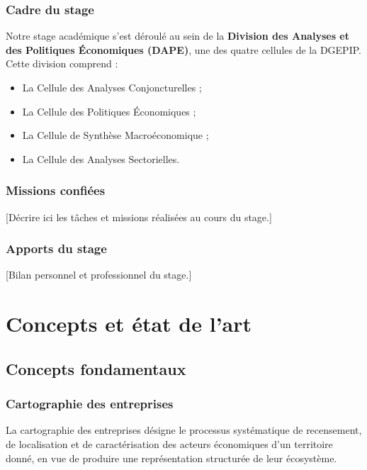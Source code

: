\documentclass[12pt, a4paper, oneside]{report}
\begin{document}
\subsection{Cadre du stage}

Notre stage académique s'est déroulé au sein de la \textbf{Division des Analyses et des Politiques Économiques (DAPE)}, une des quatre cellules de la DGEPIP. Cette division comprend :

\begin{itemize}
  \item La Cellule des Analyses Conjoncturelles ;
  \item La Cellule des Politiques Économiques ;
  \item La Cellule de Synthèse Macroéconomique ;
  \item La Cellule des Analyses Sectorielles.
\end{itemize}

\subsection{Missions confiées}

[Décrire ici les tâches et missions réalisées au cours du stage.]

\subsection{Apports du stage}

[Bilan personnel et professionnel du stage.]

\chapter{Concepts et état de l'art}
\label{chap:etat_art}

\section{Concepts fondamentaux}
\label{sec:concepts}

\subsection{Cartographie des entreprises}

\begin{definition}
  La cartographie des entreprises désigne le processus systématique de recensement, de localisation et de caractérisation des acteurs économiques d'un territoire donné, en vue de produire une représentation structurée de leur écosystème.
\end{definition}
\end{document}

